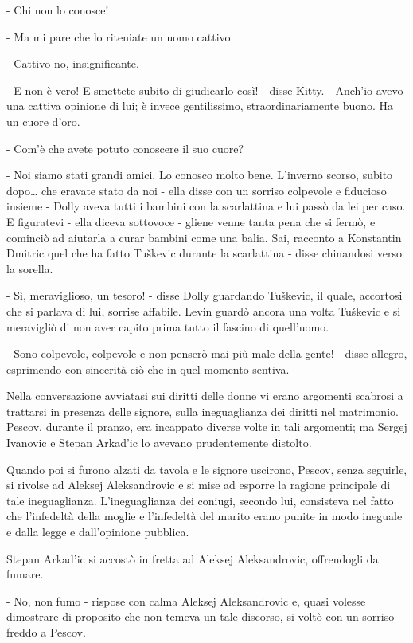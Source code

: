 - Chi non lo conosce! 

- Ma mi pare che lo riteniate un uomo cattivo. 

- Cattivo no, insignificante. 

- E non è vero! E smettete subito di giudicarlo così! - disse Kitty. - Anch'io avevo una cattiva opinione di lui; è invece gentilissimo, straordinariamente buono. Ha un cuore d'oro. 

- Com'è che avete potuto conoscere il suo cuore? 

- Noi siamo stati grandi amici. Lo conosco molto bene. L'inverno scorso, subito dopo\ldots{} che eravate stato da noi - ella disse con un sorriso colpevole e fiducioso insieme - Dolly aveva tutti i bambini con la scarlattina e lui passò da lei per caso. E figuratevi - ella diceva sottovoce - gliene venne tanta pena che si fermò, e cominciò ad aiutarla a curar bambini come una balia. Sai, racconto a Konstantin Dmitric quel che ha fatto Tuškevic durante la scarlattina - disse chinandosi verso la sorella. 

- Sì, meraviglioso, un tesoro! - disse Dolly guardando Tuškevic, il quale, accortosi che si parlava di lui, sorrise affabile. Levin guardò ancora una volta Tuškevic e si meravigliò di non aver capito prima tutto il fascino di quell'uomo. 

- Sono colpevole, colpevole e non penserò mai più male della gente! - disse allegro, esprimendo con sincerità ciò che in quel momento sentiva. 

\label{xii-3} 

Nella conversazione avviatasi sui diritti delle donne vi erano argomenti scabrosi a trattarsi in presenza delle signore, sulla ineguaglianza dei diritti nel matrimonio. Pescov, durante il pranzo, era incappato diverse volte in tali argomenti; ma Sergej Ivanovic e Stepan Arkad'ic lo avevano prudentemente distolto. 

Quando poi si furono alzati da tavola e le signore uscirono, Pescov, senza seguirle, si rivolse ad Aleksej Aleksandrovic e si mise ad esporre la ragione principale di tale ineguaglianza. L'ineguaglianza dei coniugi, secondo lui, consisteva nel fatto che l'infedeltà della moglie e l'infedeltà del marito erano punite in modo ineguale e dalla legge e dall'opinione pubblica. 

Stepan Arkad'ic si accostò in fretta ad Aleksej Aleksandrovic, offrendogli da fumare. 

- No, non fumo - rispose con calma Aleksej Aleksandrovic e, quasi volesse dimostrare di proposito che non temeva un tale discorso, si voltò con un sorriso freddo a Pescov. 

